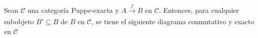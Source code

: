 \documentclass[tesis]{subfiles}
\begin{document}
\begin{Coro}\label{Mendoza-1.7.12}
    Sean $\mathscr{C}$ una categoría Puppe-exacta y $A\xrightarrow[]{f}B$ en $\mathscr{C}$. Entonces, para cualquier subobjeto $B'\subseteq B$ de $B$ en $\mathscr{C}$, se tiene el siguiente diagrama conmutativo y exacto en $\mathscr{C}$
    \begin{center}
    \end{center}
\end{Coro}
\end{document}
